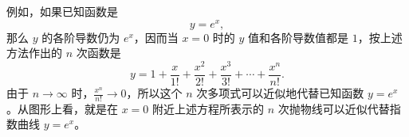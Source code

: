 例如，如果已知函数是
\[
  y = e^x,
\]
那么 $y$ 的各阶导数仍为 $e^x$，因而当 $x = 0$ 时的 $y$ 值和各阶导数值都是 $1$，按上述方法作出的 $n$ 次函数是
\[
  y = 1 + \frac{x}{1!} + \frac{x^2}{2!} + \frac{x^3}{3!} + \cdots + \frac{x^n}{n!}.
\]
由于 $n \to \infty$ 时，$\frac{x^n}{n!} \to 0$，所以这个 $n$ 次多项式可以近似地代替已知函数 $y = e^x$。从图形上看，就是在 $x = 0$ 附近上述方程所表示的 $n$ 次抛物线可以近似代替指数曲线 $y = e^x$。%
